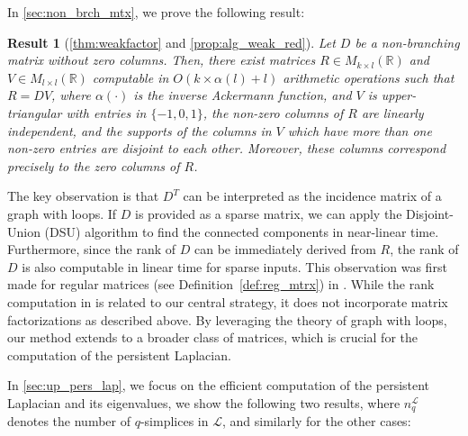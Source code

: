 \documentclass{article}
\newtheorem{resultx}{Result}
\theoremstyle{definition}
\newtheorem{remark}[theorem]{Remark}
\newcommand{\LL}{\mathcal{L}}
\begin{document}
In \cref{sec:non_brch_mtx}, we prove the following result:

\begin{resultx}[\cref{thm:weakfactor} and \cref{prop:alg_weak_red}]
    Let $D$ be a non-branching matrix without zero columns. Then, there exist matrices $R \in M_{k \times l}(\mathbb{R})$ and $V \in M_{l \times l}(\mathbb{R})$ computable in $O(k\times\alpha(l)+l)$ arithmetic operations such that $R = DV$, where $\alpha(\cdot)$ is the inverse Ackermann function,
    and $V$ is upper-triangular with entries in $\{-1, 0, 1\}$, the non-zero columns of $R$ are linearly independent,
    {and the supports of the columns in $V$ which have more than one non-zero entries are disjoint to each other.}
    Moreover, these columns correspond precisely to the zero columns of $R$.
\end{resultx}

The key observation is that $D^T$ can be interpreted as the incidence matrix of a graph with loops. 
If $D$ is provided as a sparse matrix, 
we can apply the Disjoint-Union (DSU) algorithm to find the connected components in near-linear time. 
Furthermore, since the rank of $D$ can be immediately derived from $R$, the rank of $D$ is also computable in linear time for sparse inputs. This observation was first made for regular matrices (see Definition~\ref{def:reg_mtrx}) in \cite{twononzero}. While the rank computation in \cite{twononzero} is related to our central strategy, it does not incorporate matrix factorizations as described above. 
By leveraging the theory of graph with loops, our method extends to a broader class of matrices, which is crucial for the computation of the persistent Laplacian.

In \cref{sec:up_pers_lap}, we focus on the efficient computation of the persistent Laplacian and its eigenvalues, 
we show the following two results, where $n_q^\LL$ denotes the number of $q$-simplices in $\LL$, and similarly for the other cases:
\end{document}
